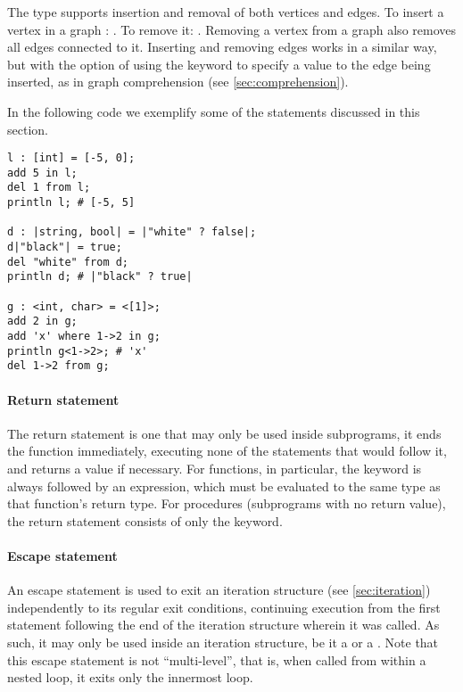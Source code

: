 The  type supports insertion and removal of both vertices and edges. To insert a vertex  in a graph :    . To remove it:    . Removing a vertex from a graph also removes all edges connected to it. Inserting and removing edges works in a similar way, but with the option of using the  keyword to specify a value to the edge being inserted, as in graph comprehension (see \ref{sec:comprehension}).

In the following code we exemplify some of the statements discussed in this section.
\begin{lstlisting}[language=Gryph]
l : [int] = [-5, 0];
add 5 in l;
del 1 from l;
println l; # [-5, 5]

d : |string, bool| = |"white" ? false|;
d|"black"| = true;
del "white" from d;
println d; # |"black" ? true|

g : <int, char> = <[1]>;
add 2 in g;
add 'x' where 1->2 in g;
println g<1->2>; # 'x'
del 1->2 from g;
\end{lstlisting}

\paragraph{Return statement}
\label{sec:return}
The return statement is one that may only be used inside subprograms, it ends the function immediately, executing none of the statements that would follow it, and returns a value if necessary. For functions, in particular, the  keyword is always followed by an expression, which must be evaluated to the same type as that function's return type. For procedures (subprograms with no return value), the return statement consists of only the  keyword.

\paragraph{Escape statement}
\label{sec:escape}
An escape statement is used to exit an iteration structure (see \ref{sec:iteration}) independently to its regular exit conditions, continuing execution from the first statement following the end of the iteration structure wherein it was called. As such, it may only be used inside an iteration structure, be it a  or a . Note that this escape statement is not ``multi-level'', that is, when called from within a nested loop, it exits only the innermost loop.

